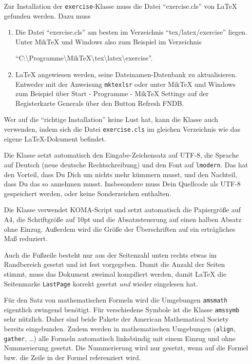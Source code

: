 \documentclass{exercise}
\begin{document}
    Zur Installation der \texttt{exercise}-Klasse muss die Datei \enquote{exercise.cls} von \LaTeX{} gefunden werden. Dazu muss
    \begin{enumerate}[1)]
      \item Die Datei \enquote{exercise.cls} am besten im Verzeichnis
        \enquote{tex/latex/exercise}
        liegen. Unter MikTeX und Windows also zum Beispiel im Verzeichnis
        
        \qquad\enquote{C:\textbackslash{}Programme\textbackslash{}MikTeX\textbackslash{}tex\textbackslash{}latex\textbackslash{}exercise}.
      
      \item \LaTeX{} angewiesen werden, seine Dateinamen-Datenbank zu aktualisieren.
        Entweder mit der Anweisung \texttt{mktexlsr} oder unter MikTeX und Windows
        zum Beispiel über \textsf{Start - Programme - MikTeX Settings} auf der
        Registerkarte \textsf{Generals} über den Button \textsf{Refresh FNDB}.
    \end{enumerate}
    
    Wer auf die \enquote{richtige Installation} keine Lust hat, kann die Klasse auch verwenden, indem sich die Datei \texttt{exercise.cls} im gleichen Verzeichnis wie das eigene \LaTeX{}-Dokument befindet.
    
    Die Klasse setzt automatisch den Eingabe-Zeichensatz auf UTF-8, die Sprache auf Deutsch (neue deutsche Rechtschreibung) und den Font auf \texttt{lmodern}. Das hat den Vorteil, dass Du Dich um nichts mehr kümmern musst, und den Nachteil, dass Du das so annehmen musst. Insbesondere muss Dein Quellcode als UTF-8 gespeichert werden, oder keine Sonderzeichen enthalten.
    
    Die Klasse verwendet KOMA-Script \cite{koma} und setzt automatisch die Papiergröße auf A4, die Schriftgröße auf 10pt und die Absatzsteuerung auf einen halben Absatz ohne Einzug. Außerdem wird die Größe der Überschriften auf ein erträgliches Maß reduziert.
    
    Auch die Fußzeile besteht nur aus der Seitenzahl unten rechts etwas im Randbereich gesetzt und ist fest vorgegeben. Damit die Anzahl der Seiten stimmt, muss das Dokument zweimal kompiliert werden, damit \LaTeX{} die Seitenmarke \texttt{LastPage} korrekt gesetzt \emph{und} wieder eingelesen hat.
    
    Für den Satz von mathematischen Formeln wird die Umgebungen \texttt{amsmath} \cite{amsmath} eigentlich zwingend benötigt. Für verschiedene Symbole ist die Klasse \texttt{amssymb} sehr nützlich. Daher sind beide Pakete der American Mathematical Society bereits eingebunden. Zudem werden in mathematischen Umgebungen (\texttt{align}, \texttt{gather}, \ldots) alle Formeln automatisch linksbündig mit einem Einzug und ohne Nummerierung gesetzt. Die Nummerierung wird nur gesetzt, wenn auf die Formel bzw. die Zeile in der Formel referenziert wird. 
    
\end{document}
